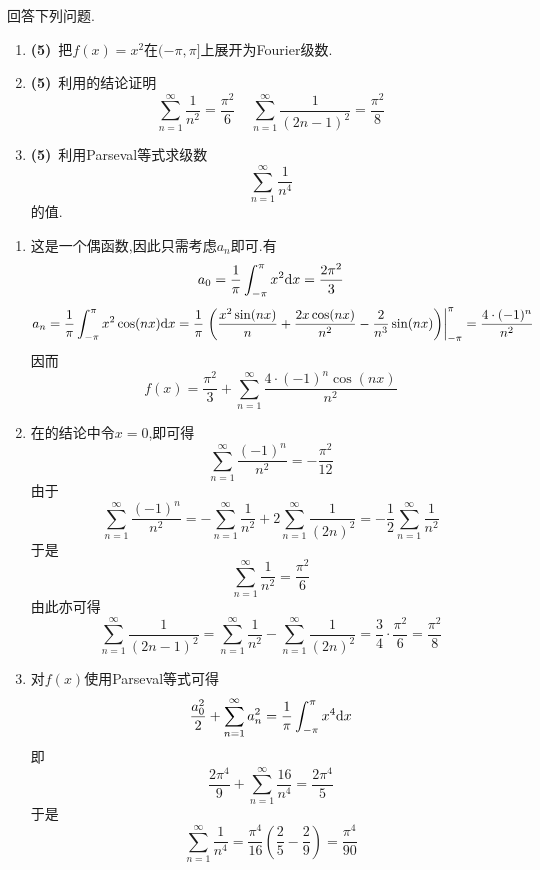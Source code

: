 \documentclass{ctexart}
\begin{document}
\begin{problem}[9.(15\songti{分})]
    回答下列问题.
    \begin{enumerate}[label=\tbf{(\arabic*)},topsep=0pt,parsep=0pt,itemsep=0pt,partopsep=0pt]
        \item \textbf{(5)}\ 把$f(x)=x^2$在$(-\pi,\pi]$上展开为Fourier级数.
        \item \textbf{(5)}\ 利用的结论证明
            \[\sum_{n=1}^{\infty}\dfrac{1}{n^2}=\dfrac{\pi^2}{6}\ \ \ \ \ \sum_{n=1}^{\infty}\dfrac{1}{(2n-1)^2}=\dfrac{\pi^2}{8}\]
        \item \textbf{(5)}\ 利用Parseval等式求级数
            \[\sum_{n=1}^{\infty}\dfrac{1}{n^4}\]
            的值.
    \end{enumerate}
\end{problem}
\begin{solution}
    \begin{enumerate}[label=\tbf{(\arabic*)},topsep=0pt,parsep=0pt,itemsep=0pt,partopsep=0pt]
        \item 这是一个偶函数,因此只需考虑$a_n$即可.有
            \[a_0=\dfrac{1}{\pi}\int_{-\pi}^{\pi}x^2\mathrm{d} x=\dfrac{2\pi^2}{3}\]
            \[a_n=\dfrac{1}{\pi}\int_{-\pi}^{\pi}x^2\cos(nx)\mathrm{d} x
            =\dfrac{1}{\pi}\left.\left(\dfrac{x^2\sin(nx)}{n}+\dfrac{2x\cos(nx)}{n^2}-\dfrac{2}{n^3}\sin(nx)\right)\right|_{-\pi}^{\pi}
            =\dfrac{4\cdot(-1)^n}{n^2}\]
            因而
            \[f(x)=\dfrac{\pi^2}{3}+\sum_{n=1}^{\infty}\dfrac{4\cdot(-1)^n\cos(nx)}{n^2}\]
        \item 在的结论中令$x=0$,即可得
            \[\sum_{n=1}^{\infty}\dfrac{(-1)^n}{n^2}=-\dfrac{\pi^2}{12}\]
            由于
            \[\sum_{n=1}^{\infty}\dfrac{(-1)^n}{n^2}=-\sum_{n=1}^{\infty}\dfrac{1}{n^2}+2\sum_{n=1}^{\infty}\dfrac{1}{(2n)^2}=-\dfrac12\sum_{n=1}^{\infty}\dfrac{1}{n^2}\]
            于是
            \[\sum_{n=1}^{\infty}\dfrac{1}{n^2}=\dfrac{\pi^2}{6}\]
            由此亦可得
            \[\sum_{n=1}^{\infty}\dfrac{1}{(2n-1)^2}=\sum_{n=1}^{\infty}\dfrac{1}{n^2}-\sum_{n=1}^{\infty}\dfrac{1}{(2n)^2}=\dfrac34\cdot\dfrac{\pi^2}{6}=\dfrac{\pi^2}{8}\]
        \item 对$f(x)$使用Parseval等式可得
            \[\dfrac{a_0^2}{2}+\sum_{n=1}^{\infty}a_n^2=\dfrac{1}{\pi}\int_{-\pi}^{\pi}x^4\mathrm{d} x\]
            即
            \[\dfrac{2\pi^4}{9}+\sum_{n=1}^{\infty}\dfrac{16}{n^4}=\dfrac{2\pi^4}{5}\]
            于是
            \[\sum_{n=1}^{\infty}\dfrac{1}{n^4}=\dfrac{\pi^4}{16}\left(\dfrac{2}{5}-\dfrac{2}{9}\right)=\dfrac{\pi^4}{90}\]
    \end{enumerate}
\end{solution}
\end{document}
